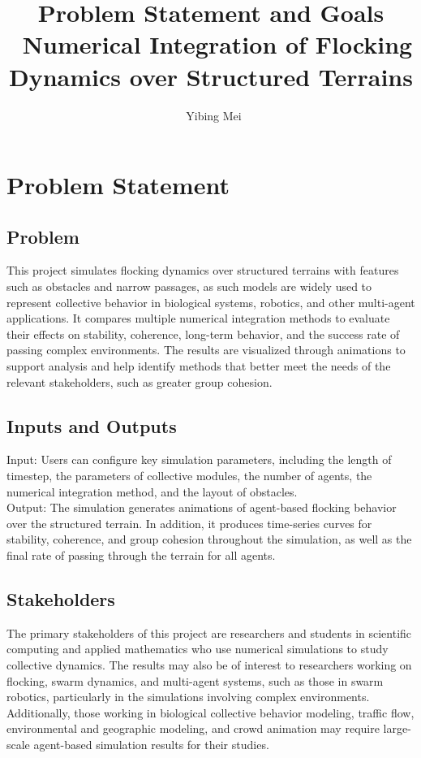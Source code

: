 \documentclass{article}
\title{Problem Statement and Goals\\\ Numerical Integration of Flocking Dynamics over Structured Terrains}
\author{\ Yibing Mei}
\date{}
\begin{document}
\maketitle

\section{Problem Statement}

\subsection{Problem}

This project simulates flocking dynamics over structured terrains with features such as obstacles and narrow passages, 
as such models are widely used to represent collective behavior in biological systems, robotics, and other multi-agent 
applications. It compares multiple numerical integration methods to evaluate their effects on stability, coherence, 
long-term behavior, and the success rate of passing complex environments. The results are visualized through animations 
to support analysis and help identify methods that better meet the needs of the relevant stakeholders, such as greater 
group cohesion.


\subsection{Inputs and Outputs} 

Input: Users can configure key simulation parameters, including the length of timestep, the parameters of collective 
modules, the number of agents, the numerical integration method, and the layout of obstacles. \\
Output: The simulation generates animations of agent-based flocking behavior over the structured terrain. In addition, 
it produces time-series curves for stability, coherence, and group cohesion throughout the simulation, as well as the 
final rate of passing through the terrain for all agents.


\subsection{Stakeholders} 

The primary stakeholders of this project are researchers and students in scientific computing and applied mathematics who 
use numerical simulations to study collective dynamics. The results may also be of interest to researchers working on 
flocking, swarm dynamics, and multi-agent systems, such as those in swarm robotics, particularly in the simulations 
involving complex environments. Additionally, those working in biological collective behavior modeling, traffic flow, 
environmental and geographic modeling, and crowd animation may require large-scale agent-based simulation results for 
their studies.
\end{document}
